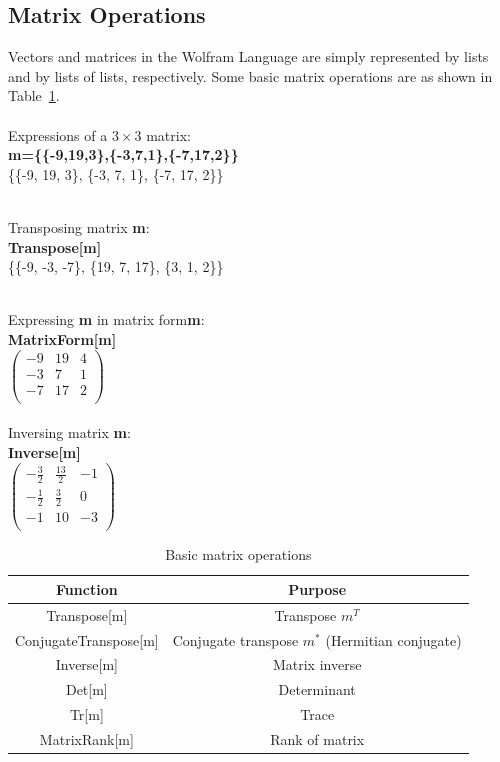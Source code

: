 \subsection{Matrix Operations}
Vectors and matrices in the Wolfram Language are simply represented by lists and by lists of lists, respectively.
Some basic matrix operations are as shown in Table~\ref{table:matrixOps}.
~\\\\
Expressions of a $3\times3$ matrix:\\
\textbf{m=\{\{-9,19,3\},\{-3,7,1\},\{-7,17,2\}\}}\\
\{\{-9, 19, 3\}, \{-3, 7, 1\}, \{-7, 17, 2\}\}

~\\
Transposing matrix \textbf{m}:\\
\textbf{Transpose[m]}\\
\{\{-9, -3, -7\}, \{19, 7, 17\}, \{3, 1, 2\}\}

~\\
Expressing \textbf{m} in matrix form\textbf{m}:\\
\textbf{MatrixForm[m]}\\
$\left(
\begin{array}{ccc}
 -9 & 19 & 4 \\
 -3 & 7 & 1 \\
 -7 & 17 & 2 \\
\end{array}
\right)$
\\~\\
Inversing matrix \textbf{m}:\\
\textbf{Inverse[m]}\\
$
\left(
\begin{array}{ccc}
 -\frac{3}{2} & \frac{13}{2} & -1 \\
 -\frac{1}{2} & \frac{3}{2} & 0 \\
 -1 & 10 & -3 \\
\end{array}
\right)
$

\begin{table}[H]
\caption{Basic matrix operations} %
\centering %
\begin{tabular}{c c}
\hline %
Function & Purpose\\
\hline %
Transpose[m] & Transpose $m^T$ \\
ConjugateTranspose[m] & Conjugate transpose $m^*$ (Hermitian conjugate) \\
Inverse[m] & Matrix inverse\\
Det[m] & Determinant\\
Tr[m] & Trace\\
MatrixRank[m] & Rank of matrix\\
[1ex] %
\hline %
\end{tabular}
\label{table:matrixOps} %
\end{table}

